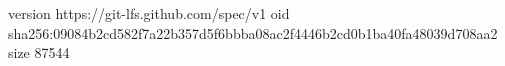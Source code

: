version https://git-lfs.github.com/spec/v1
oid sha256:09084b2cd582f7a22b357d5f6bbba08ac2f4446b2cd0b1ba40fa48039d708aa2
size 87544
